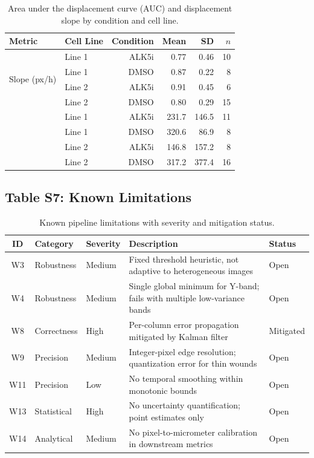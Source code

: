 \begin{table}[H]
  \centering
  \caption{Area under the displacement curve (AUC) and displacement slope by condition and cell line.}\label{tab:auc_slope}
  \begin{tabular}{llrrrr}
    \toprule
    Metric & Cell Line & Condition & Mean & SD & $n$ \\
    \midrule
    \multirow{4}{*}{Slope (px/h)} & Line 1 & ALK5i & 0.77 & 0.46 & 10 \\
    & Line 1 & DMSO & 0.87 & 0.22 & 8 \\
    & Line 2 & ALK5i & 0.91 & 0.45 & 6 \\
    & Line 2 & DMSO & 0.80 & 0.29 & 15 \\
    \addlinespace
    \multirow{4}{*}{AUC (px$\cdot$h)} & Line 1 & ALK5i & 231.7 & 146.5 & 11 \\
    & Line 1 & DMSO & 320.6 & 86.9 & 8 \\
    & Line 2 & ALK5i & 146.8 & 157.2 & 8 \\
    & Line 2 & DMSO & 317.2 & 377.4 & 16 \\
    \bottomrule
  \end{tabular}
\end{table}

\subsection*{Table S7: Known Limitations}

\begin{table}[H]
  \centering
  \caption{Known pipeline limitations with severity and mitigation status.}\label{tab:limitations}
  \small
  \begin{tabular}{cllll}
    \toprule
    ID & Category & Severity & Description & Status \\
    \midrule
    W3  & Robustness  & Medium & Fixed threshold heuristic, not adaptive to heterogeneous images & Open \\
    W4  & Robustness  & Medium & Single global minimum for Y-band; fails with multiple low-variance bands & Open \\
    W8  & Correctness & High   & Per-column error propagation mitigated by Kalman filter & Mitigated \\
    W9  & Precision   & Medium & Integer-pixel edge resolution; quantization error for thin wounds & Open \\
    W11 & Precision   & Low    & No temporal smoothing within monotonic bounds & Open \\
    W13 & Statistical & High   & No uncertainty quantification; point estimates only & Open \\
    W14 & Analytical  & Medium & No pixel-to-micrometer calibration in downstream metrics & Open \\
    \bottomrule
  \end{tabular}
\end{table}

